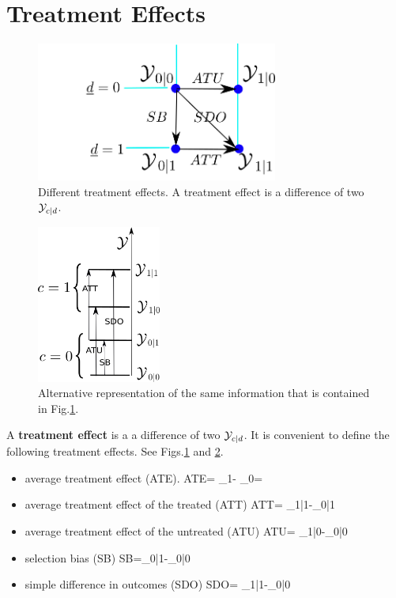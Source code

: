 \section{Treatment Effects}

\begin{figure}[h!]
\centering
\includegraphics[height=1.8in]
{pot-out/y-diffs-square.png}
\caption{Different treatment effects.  
A treatment effect is a difference of 
two ${\cal Y}_{c| d }$.} 
\label{fig-y-diffs-square}
\end{figure}

\begin{figure}[h!]
\centering
\includegraphics[width=1.6in]
{pot-out/po-y-levels.png}
\caption{Alternative
representation of the same
information that is contained in
Fig.\ref{fig-y-diffs-square}.} 
\label{fig-po-y-levels}
\end{figure}

A {\bf treatment effect} is a
a difference of two  ${\cal Y}_{c| d }$.
It is convenient to
define the following 
treatment effects. 
See Figs.\ref{fig-y-diffs-square}
and \ref{fig-po-y-levels}.




\begin{itemize}


\item average treatment effect
 (ATE).
\beq
{\color{red}ATE}=
\caly_{1}-
\caly_{0}= \delta
\eeq

\item average treatment effect 
of the treated (ATT)
\beq
{\color{red}ATT}=
\caly_{1|1}-\caly_{0|1}
\eeq


\item average
treatment effect of the untreated (ATU)
\beq
{\color{red}ATU}=
\caly_{1|0}-\caly_{0|0}
\eeq

\item selection bias (SB)
\beq
{\color{red}SB}=\caly_{0|1}-\caly_{0|0}
\eeq


\item simple difference in outcomes (SDO)
\beq
{\color{red} SDO}= \caly_{1|1}-\caly_{0|0}
\eeq


\end{itemize}




